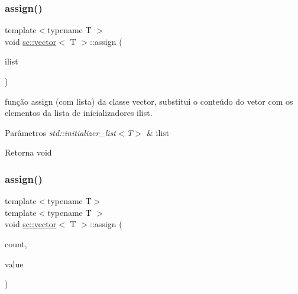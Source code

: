 \subsubsection{\texorpdfstring{assign()}{assign()}\hspace{0.1cm}{\footnotesize\ttfamily [3/7]}}
{\footnotesize\ttfamily template$<$typename T $>$ \\
void \mbox{\hyperlink{classsc_1_1vector}{sc\+::vector}}$<$ T $>$\+::assign (\begin{DoxyParamCaption}\item[{std\+::initializer\+\_\+list$<$ T $>$}]{ilist }\end{DoxyParamCaption})}

função assign (com lista) da classe vector, substitui o conteúdo do vetor com os elementos da lista de inicializadores ilist. 
\begin{DoxyParams}{Parâmetros}
{\em std\+::initializer\+\_\+list$<$\+T$>$} & ilist \\
\hline
\end{DoxyParams}
\begin{DoxyReturn}{Retorna}
void 
\end{DoxyReturn}
\mbox{\label{classsc_1_1vector_a6905779e8818b55d12ce46b75ab983d6}} 
\subsubsection{\texorpdfstring{assign()}{assign()}\hspace{0.1cm}{\footnotesize\ttfamily [4/7]}}
{\footnotesize\ttfamily template$<$typename T$>$ \\
template$<$typename T $>$ \\
void \mbox{\hyperlink{classsc_1_1vector}{sc\+::vector}}$<$ T $>$\+::assign (\begin{DoxyParamCaption}\item[{typename \mbox{\hyperlink{classsc_1_1vector}{vector}}$<$ T $>$\+::size\+\_\+type}]{count,  }\item[{const T \&}]{value }\end{DoxyParamCaption})}

\mbox{\label{classsc_1_1vector_a6905779e8818b55d12ce46b75ab983d6}} 
